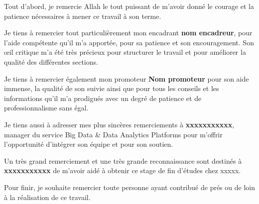 
Tout d'abord, je remercie Allah le tout puissant de m'avoir donné le courage et la patience nécessaires à mener ce travail à son terme.

Je tiens à remercier tout particulièrement mon encadrant \textbf{nom encadreur}, pour l’aide compétente qu’il m’a apportée, pour sa patience et son encouragement. Son œil critique m’a été très précieux pour structurer le travail et pour améliorer la qualité des différentes sections.

Je tiens à remercier également mon promoteur \textbf{Nom promoteur} pour son aide immense, la qualité de son suivie ainsi que pour tous les conseils et les informations qu'il m’a prodigués avec un degré de patience et de professionnalisme sans égal.

Je tiens aussi à adresser mes plus sincères remerciements à \textbf{xxxxxxxxxxx}, manager du service Big Data \& Data Analytics Platforms pour m'offrir l'opportunité d'intégrer son équipe et pour son soutien.

Un très grand remerciement et une très grande reconnaissance sont destinés à \textbf{xxxxxxxxxxx} de m'avoir aidé à obtenir ce stage de fin d'études chez xxxxx.



Pour finir, je souhaite remercier toute personne ayant contribué de prés ou de loin à la réalisation de ce travail.

\clearpage